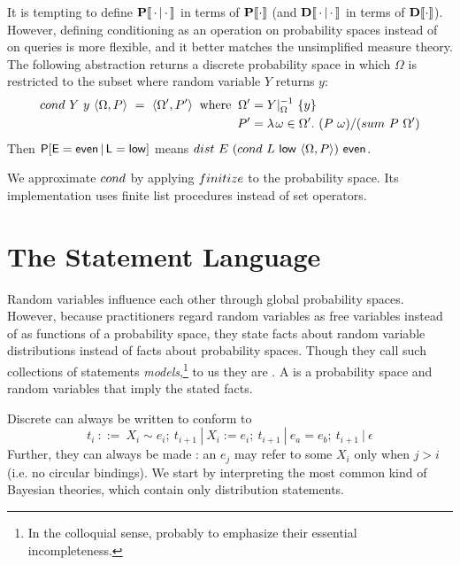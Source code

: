 It is tempting to define $\mathbf{P}\!\left\llbracket{\,\cdot\,|\,\cdot\,}\right\rrbracket$ in terms of $\mathbf{P}\!\left\llbracket{\cdot}\right\rrbracket$ (and $\mathbf{D}\!\left\llbracket{\,\cdot\,|\,\cdot\,}\right\rrbracket$ in terms of $\mathbf{D}\!\left\llbracket{\cdot}\right\rrbracket$). However, defining conditioning as an operation on probability spaces instead of on queries is more flexible, and it better matches the unsimplified measure theory. The following abstraction returns a discrete probability space in which $\Omega$ is restricted to the subset where random variable $Y$ returns $y$:
\begin{equation}
\begin{split}
	{cond}\ {Y}\ {y}\ {\langle{\Omega,P}\rangle}\ =\ {\langle{\Omega',P'}\rangle}
	\;\;\text{where}\;\;
		\Omega' &= {{Y}\lvert_{\Omega}^{-1}}\ {\{{y}\}} \\
		P' &= \lambda\mspace{2mu}{\omega \in {\Omega'}}\ldotp\, {{\left({P}\ {\omega}\right)} / {\left({sum}\ {P}\ {\Omega'}\right)}}
\end{split}
\end{equation}
Then $\mathsf{P}\!\left[{\mathsf{E=even \,|\, L=low}}\right]$ means ${dist}\ {E}\ {\left({cond}\ {L}\ {\mathsf{low}}\ {\langle{\Omega,P}\rangle}\right)}\ {\mathsf{even}}$.

We approximate $cond$ by applying $finitize$ to the probability space. Its implementation uses finite list procedures instead of set operators.


\section{The Statement Language}

\newcommand{\ModelNote}{In the colloquial sense, probably to emphasize their essential incompleteness.}

Random variables influence each other through global probability spaces. However, because practitioners regard random variables as free variables instead of as functions of a probability space, they state facts about random variable distributions instead of facts about probability spaces. Though they call such collections of statements \textit{models},\footnote{\ModelNote} to us they are . A  is a probability space and random variables that imply the stated facts.

Discrete  can always be written to conform to
\begin{equation}
	t_i\ ::=\ X_i \sim e_i;\ t_{i+1}\ |\ X_i := e_i;\ t_{i+1}\ |\ e_a = e_b;\ t_{i+1}\ |\  \epsilon
\end{equation}
Further, they can always be made : an $e_j$ may refer to some $X_i$ only when $j > i$ (i.e. no circular bindings). We start by interpreting the most common kind of Bayesian theories, which contain only distribution statements.

